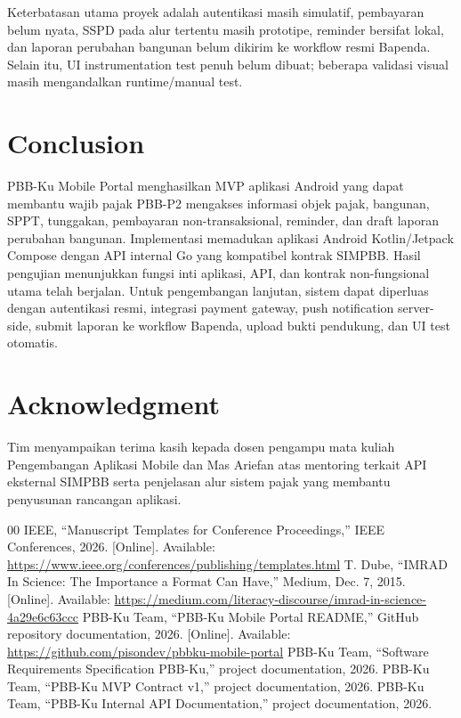\documentclass[conference]{report-assets/ref/IEEE-conference-template-062824/IEEEtran}
\begin{document}
Keterbatasan utama proyek adalah autentikasi masih simulatif, pembayaran belum nyata, SSPD pada alur tertentu masih prototipe, reminder bersifat lokal, dan laporan perubahan bangunan belum dikirim ke workflow resmi Bapenda. Selain itu, UI instrumentation test penuh belum dibuat; beberapa validasi visual masih mengandalkan runtime/manual test.

\section{Conclusion}
PBB-Ku Mobile Portal menghasilkan MVP aplikasi Android yang dapat membantu wajib pajak PBB-P2 mengakses informasi objek pajak, bangunan, SPPT, tunggakan, pembayaran non-transaksional, reminder, dan draft laporan perubahan bangunan. Implementasi memadukan aplikasi Android Kotlin/Jetpack Compose dengan API internal Go yang kompatibel kontrak SIMPBB. Hasil pengujian menunjukkan fungsi inti aplikasi, API, dan kontrak non-fungsional utama telah berjalan. Untuk pengembangan lanjutan, sistem dapat diperluas dengan autentikasi resmi, integrasi payment gateway, push notification server-side, submit laporan ke workflow Bapenda, upload bukti pendukung, dan UI test otomatis.

\section*{Acknowledgment}
Tim menyampaikan terima kasih kepada dosen pengampu mata kuliah Pengembangan Aplikasi Mobile dan Mas Ariefan atas mentoring terkait API eksternal SIMPBB serta penjelasan alur sistem pajak yang membantu penyusunan rancangan aplikasi.

\begin{thebibliography}{00}
 IEEE, ``Manuscript Templates for Conference Proceedings,'' IEEE Conferences, 2026. [Online]. Available: \url{https://www.ieee.org/conferences/publishing/templates.html}
 T. Dube, ``IMRAD In Science: The Importance a Format Can Have,'' Medium, Dec. 7, 2015. [Online]. Available: \url{https://medium.com/literacy-discourse/imrad-in-science-4a29e6c63ccc}
 PBB-Ku Team, ``PBB-Ku Mobile Portal README,'' GitHub repository documentation, 2026. [Online]. Available: \url{https://github.com/pisondev/pbbku-mobile-portal}
 PBB-Ku Team, ``Software Requirements Specification PBB-Ku,'' project documentation, 2026.
 PBB-Ku Team, ``PBB-Ku MVP Contract v1,'' project documentation, 2026.
 PBB-Ku Team, ``PBB-Ku Internal API Documentation,'' project documentation, 2026.
\end{thebibliography}
\end{document}
